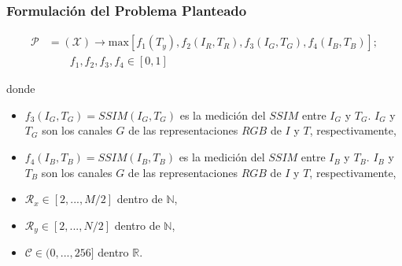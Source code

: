 \documentclass[usenames,dvipsnames]{beamer}
\begin{document}
\begin{frame}
\frametitle{Formulación del Problema Planteado} 

\begin{equation}
\begin{split}
\mathscr{P} &= (\mathscr{X}) \longrightarrow \text{max}[f_1(T_y),f_2(I_R,T_R),f_3(I_G,T_G),f_4(I_B,T_B)]; \\
            & \qquad f_1,f_2,f_3,f_4 \in [0,1]
\end{split}
\end{equation}


donde

\begin{itemize}
	\item $f_3(I_G\label{symbol:ioriginalg},T_G\label{symbol:imejoradag})=SSIM(I_G,T_G)$ es la medición del $SSIM$ entre $I_G$ y $T_G$. $I_G$ y $T_G$ son los canales $G$ de las representaciones $RGB$ de $I$ y $T$, respectivamente,
	\item $f_4(I_B\label{symbol:ioriginalb},T_B\label{symbol:imejoradab})=SSIM(I_B,T_B)$ es la medición del $SSIM$ entre $I_B$ y $T_B$. $I_B$ y $T_B$ son los canales $G$ de las representaciones $RGB$ de $I$ y $T$, respectivamente,
\end{itemize}


\begin{itemize}
	\item $\mathscr{R}_x \in [2,...,M/2]$ dentro de $\mathbb{N}$,
	\item $\mathscr{R}_y \in [2,...,N/2]$ dentro de $\mathbb{N}$,
	\item $\mathscr{C} \in (0,...,256]$ dentro $\mathbb{R}$.
\end{itemize}


\end{frame}

\end{document}
